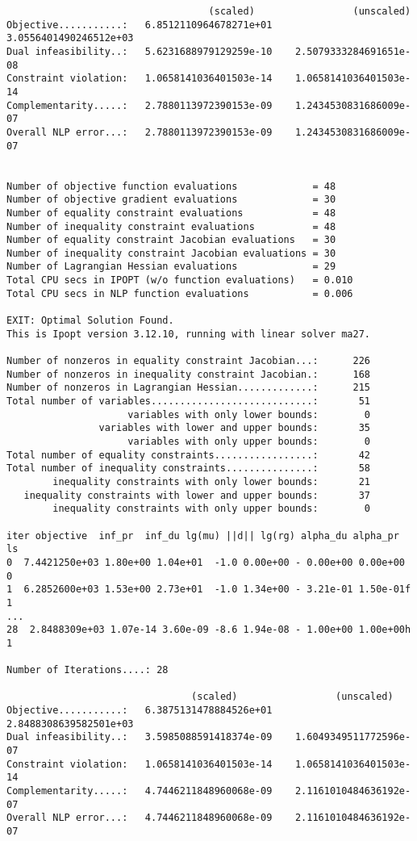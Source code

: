 \begin{lstlisting}
                                   (scaled)                 (unscaled)
Objective...........:   6.8512110964678271e+01    3.0556401490246512e+03
Dual infeasibility..:   5.6231688979129259e-10    2.5079333284691651e-08
Constraint violation:   1.0658141036401503e-14    1.0658141036401503e-14
Complementarity.....:   2.7880113972390153e-09    1.2434530831686009e-07
Overall NLP error...:   2.7880113972390153e-09    1.2434530831686009e-07


Number of objective function evaluations             = 48
Number of objective gradient evaluations             = 30
Number of equality constraint evaluations            = 48
Number of inequality constraint evaluations          = 48
Number of equality constraint Jacobian evaluations   = 30
Number of inequality constraint Jacobian evaluations = 30
Number of Lagrangian Hessian evaluations             = 29
Total CPU secs in IPOPT (w/o function evaluations)   = 0.010
Total CPU secs in NLP function evaluations           = 0.006

EXIT: Optimal Solution Found.
This is Ipopt version 3.12.10, running with linear solver ma27.

Number of nonzeros in equality constraint Jacobian...:      226
Number of nonzeros in inequality constraint Jacobian.:      168
Number of nonzeros in Lagrangian Hessian.............:      215
Total number of variables............................:       51
                     variables with only lower bounds:        0
                variables with lower and upper bounds:       35
                     variables with only upper bounds:        0
Total number of equality constraints.................:       42
Total number of inequality constraints...............:       58
        inequality constraints with only lower bounds:       21
   inequality constraints with lower and upper bounds:       37
        inequality constraints with only upper bounds:        0

iter objective  inf_pr  inf_du lg(mu) ||d|| lg(rg) alpha_du alpha_pr  ls
0  7.4421250e+03 1.80e+00 1.04e+01  -1.0 0.00e+00 - 0.00e+00 0.00e+00   0
1  6.2852600e+03 1.53e+00 2.73e+01  -1.0 1.34e+00 - 3.21e-01 1.50e-01f  1
...
28  2.8488309e+03 1.07e-14 3.60e-09 -8.6 1.94e-08 - 1.00e+00 1.00e+00h  1

Number of Iterations....: 28

                                (scaled)                 (unscaled)
Objective...........:   6.3875131478884526e+01    2.8488308639582501e+03
Dual infeasibility..:   3.5985088591418374e-09    1.6049349511772596e-07
Constraint violation:   1.0658141036401503e-14    1.0658141036401503e-14
Complementarity.....:   4.7446211848960068e-09    2.1161010484636192e-07
Overall NLP error...:   4.7446211848960068e-09    2.1161010484636192e-07



\end{lstlisting}
